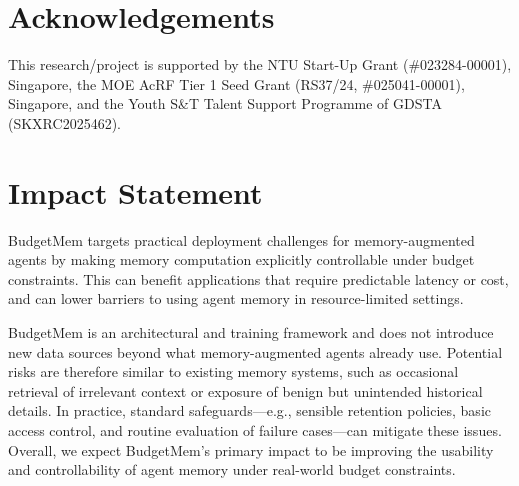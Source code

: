 \documentclass{article}
\theoremstyle{plain}
\theoremstyle{definition}
\theoremstyle{remark}
\begin{document}








\section*{Acknowledgements}
This research/project is supported by the NTU Start-Up Grant (\#023284-00001), Singapore, the MOE AcRF Tier 1 Seed Grant (RS37/24, \#025041-00001), Singapore, and the Youth S\&T Talent Support Programme of GDSTA (SKXRC2025462).





\section*{Impact Statement}

BudgetMem targets practical deployment challenges for memory-augmented agents by making memory computation explicitly controllable under budget constraints. This can benefit applications that require predictable latency or cost, and can lower barriers to using agent memory in resource-limited settings. 

BudgetMem is an architectural and training framework and does not introduce new data sources beyond what memory-augmented agents already use. Potential risks are therefore similar to existing memory systems, such as occasional retrieval of irrelevant context or exposure of benign but unintended historical details. In practice, standard safeguards---e.g., sensible retention policies, basic access control, and routine evaluation of failure cases---can mitigate these issues. Overall, we expect BudgetMem’s primary impact to be improving the usability and controllability of agent memory under real-world budget constraints.








\end{document}
